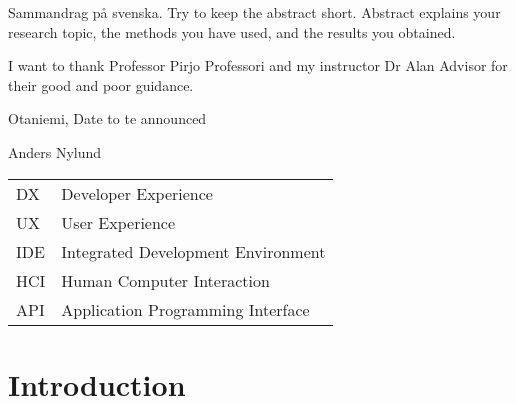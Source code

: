 \documentclass[english, 12pt, a4paper, sci, utf8, a-1b, online]{aaltothesis}
\begin{document}
\newpage

%
\begin{abstractpage}[swedish]
  Sammandrag på svenska.
  Try to keep the abstract short. Abstract explains your research topic,
  the methods you have used, and the results you obtained.
\end{abstractpage}

I want to thank Professor Pirjo Professori and my instructor Dr Alan Advisor for their good and poor guidance.

\vspace{5cm}
Otaniemi, Date to te announced

\vspace{5mm}
{\hfill Anders Nylund \hspace{1cm}}

\newpage


\thesistableofcontents


\begin{tabular}{ll}
  DX  & Developer Experience               \\
  UX  & User Experience                    \\
  IDE & Integrated Development Environment \\
  HCI & Human Computer Interaction         \\
  API & Application Programming Interface  \\
\end{tabular}

\cleardoublepage
\section{Introduction}
\end{document}
